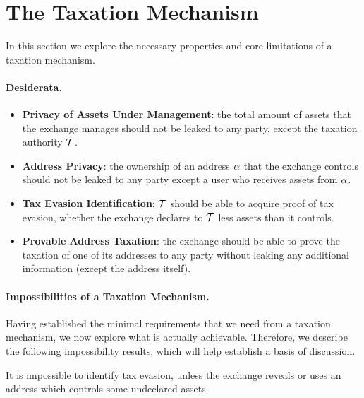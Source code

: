 \section{The Taxation Mechanism}\label{sec:taxation}

In this section we explore the necessary properties and core limitations of a
taxation mechanism.

\paragraph{Desiderata.}\label{subsec:taxation-desiderata}

\begin{itemize}
    \item \textbf{Privacy of Assets Under Management}: the total amount of assets
        that the exchange manages should not be leaked to any party, except the
        taxation authority $\mathcal{T}$.
    \item \textbf{Address Privacy}: the ownership of an address $\alpha$ that
        the exchange controls should not be leaked to any party except a
        user who receives assets from $\alpha$.
    \item \textbf{Tax Evasion Identification}: $\mathcal{T}$ should be able to
        acquire proof of tax evasion, \ie whether the exchange declares to
        $\mathcal{T}$ less assets than it controls.
    \item \textbf{Provable Address Taxation}: the
        exchange should be able to prove the taxation of one of its addresses
        to any party without leaking any additional information (except the
        address itself).
\end{itemize}

\paragraph{Impossibilities of a Taxation Mechanism.}\label{subsec:taxation-properties}

Having established the minimal requirements that we need from a taxation
mechanism, we now explore what is actually achievable. Therefore, we describe
the following impossibility results, which will help establish a basis of
discussion.

\begin{proposition}\label{prop:tax-identification-impossibility}
    It is impossible to identify tax evasion, unless the exchange reveals or
    uses an address which controls some undeclared assets.
\end{proposition}

